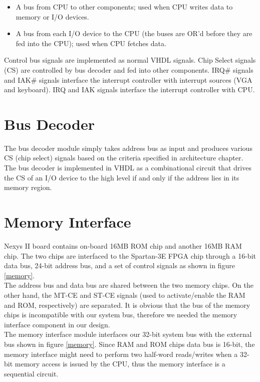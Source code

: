 \documentclass[oneside]{book}
\begin{document}
\begin{itemize}
\item A bus from CPU to other components; used when CPU writes data to
      memory or I/O devices.
\item A bus from each I/O device to the CPU (the buses are OR'd before
      they are fed into the CPU); used when CPU fetches data.
\end{itemize}

Control bus signals are implemented as normal VHDL signals. Chip Select
signals (CS) are controlled by bus decoder and fed into other components.
IRQ\# signals and IAK\# signals interface the interrupt controller with
interrupt sources (VGA and keyboard). IRQ and IAK signals interface
the interrupt controller with CPU.

\section {Bus Decoder}

The bus decoder module simply takes address bus as input and produces
various CS (chip select) signals based on the criteria specified in
architecture chapter. The bus decoder is implemented in VHDL as a
combinational circuit that drives the CS of an I/O device to the
high level if and only if the address lies in its memory region.

\section {Memory Interface}

Nexys II board contains on-board 16MB ROM chip and another 16MB RAM chip.
The two chips are interfaced to the Spartan-3E FPGA chip through a 16-bit
data bus, 24-bit address bus, and a set of control signals as shown
in figure \ref{memory}.\\

The address bus and data bus are shared between the two memory chips.
On the other hand, the MT-CE and ST-CE signals (used to activate/enable
the RAM and ROM, respectively) are separated. It is obvious that
the bus of the memory chips is incompatible with our system bus, therefore
we needed the memory interface component in our design.\\

The memory interface module interfaces our 32-bit system bus with the
external bus shown in figure \ref{memory}. Since RAM and ROM chips data
bus is 16-bit, the memory interface might need to perform two half-word
reads/writes when a 32-bit memory access is issued by the CPU, thus
the memory interface is a sequential circuit.\\
\end{document}
